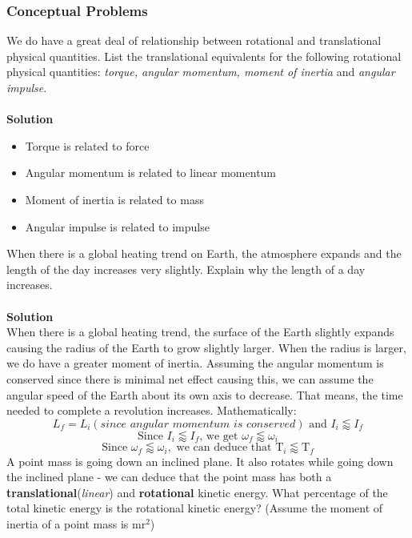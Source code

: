 \documentclass[9pt,addpoints]{exam}
\begin{document}
	\begin{questions}
		\subsubsection*{Conceptual Problems}
		\question We do have a great deal of relationship between rotational and translational physical quantities. List the translational equivalents for the following rotational physical quantities: \textit{torque, angular momentum, moment of inertia} and \textit{angular impulse}. \\ \\
		\textbf{Solution}
		\begin{itemize}
			\item Torque is related to force
			\item Angular momentum is related to linear momentum
			\item Moment of inertia is related to mass
			\item Angular impulse is related to impulse
		\end{itemize}
		\question When there is a global heating trend on Earth, the atmosphere expands and the length of the day increases very slightly. Explain why the length of a day increases. \\ \\
		\textbf{Solution} \\
		When there is a global heating trend, the surface of the Earth slightly expands causing the radius of the Earth to grow slightly larger. When the radius is larger, we do have a greater moment of inertia. Assuming the angular momentum is conserved since there is minimal net effect causing this, we can assume the angular speed of the Earth about its own axis to decrease. That means, the time needed to complete a revolution increases. Mathematically:
		$$L_f=L_i(\textit{since angular momentum is conserved})\text{  and  }I_i\lessapprox I_f$$
		$$\text{Since }I_i\lessapprox I_f\text{, we get   }\omega_f\lessapprox\omega_i$$
		$$\text{Since }\omega_f\lessapprox\omega_i,\text{ we can deduce that }\text{T}_i\lessapprox\text{T}_f$$
		\question A point mass is going down an inclined plane. It also rotates while going down the inclined plane - we can deduce that the point mass has both a \textbf{translational}(\textit{linear}) and \textbf{rotational} kinetic energy. What percentage of the total kinetic energy is the rotational kinetic energy? (Assume the moment of inertia of a point mass is $\text{mr}^2$) \\ \\

\end{questions}
\end{document}
